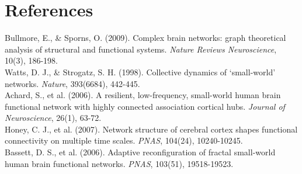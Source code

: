 \documentclass[11pt,fleqn]{article}
\begin{document}
\section*{References}
\noindent [1] Bullmore, E., \& Sporns, O. (2009). Complex brain networks: graph theoretical analysis of structural and functional systems. \textit{Nature Reviews Neuroscience}, 10(3), 186-198. \\
\noindent [2] Watts, D. J., \& Strogatz, S. H. (1998). Collective dynamics of ‘small-world’ networks. \textit{Nature}, 393(6684), 442-445. \\
\noindent [3] Achard, S., et al. (2006). A resilient, low-frequency, small-world human brain functional network with highly connected association cortical hubs. \textit{Journal of Neuroscience}, 26(1), 63-72. \\
\noindent [4] Honey, C. J., et al. (2007). Network structure of cerebral cortex shapes functional connectivity on multiple time scales. \textit{PNAS}, 104(24), 10240-10245. \\
\noindent [5] Bassett, D. S., et al. (2006). Adaptive reconfiguration of fractal small-world human brain functional networks. \textit{PNAS}, 103(51), 19518-19523.
\end{document}
